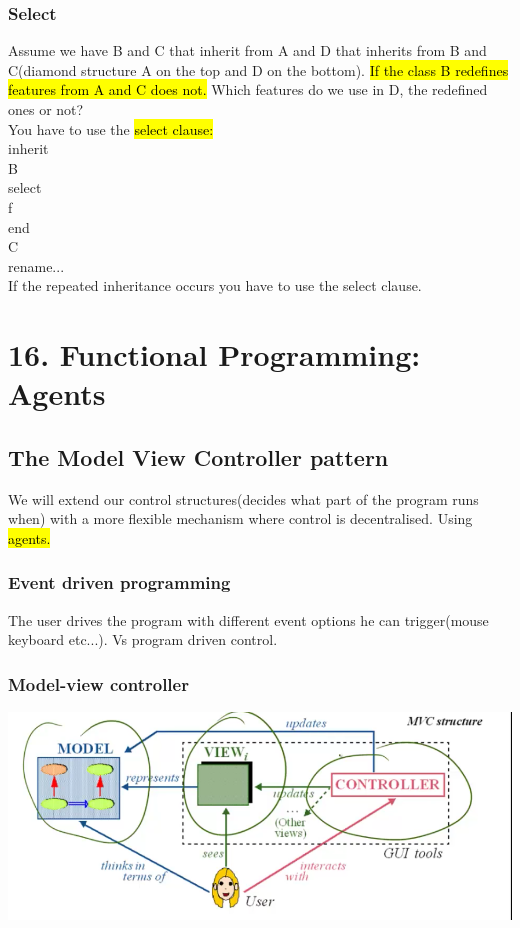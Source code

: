 \documentclass[11pt]{article}
\newcommand\tab[1][1cm]{\hspace*{#1}}
\newcommand\back[1][-3cm]{\hspace*{#1}}
\begin{document}
\subsubsection{Select}
Assume we have B and C that inherit from A and D that inherits from B and C(diamond structure A on the top and D on the bottom). \hl{If the class B redefines features from A and C does not.} Which features do we use in D, the redefined ones or not?\\You have to use the \hl{select clause:}\\inherit\\\tab B\\\tab\tab select\\\tab\tab\tab f\\\tab\tab end\\\tab C\\\tab\tab rename...\\
If the repeated inheritance occurs you have to use the select clause.
\section{16. Functional Programming: Agents}
\subsection{The Model View Controller pattern}
We will extend our control structures(decides what part of the program runs when) with a more flexible mechanism where control is decentralised. Using \hl{agents.}
\subsubsection{Event driven programming}
The user drives the program with different event options he can trigger(mouse keyboard etc...). Vs program driven control.
\subsubsection{Model-view controller}
\back\includegraphics{model}
\end{document}
